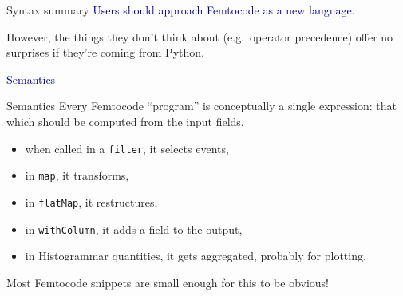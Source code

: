 \documentclass{beamer}
\begin{document}
\begin{frame}{Syntax summary}
\vspace{0.5 cm}
\textcolor{darkblue}{Users should approach Femtocode as a new language.}

\vspace{0.5 cm}
However, the things they don't think about (e.g.\ operator precedence) offer no surprises if they're coming from Python.

\vspace{0.5 cm}

\vspace{0.5 cm}

\vspace{0.5 cm}
\end{frame}

\begin{frame}{}
\begin{center}
\textcolor{darkblue}{\huge Semantics}
\end{center}
\end{frame}

\begin{frame}{Semantics}
Every Femtocode ``program'' is conceptually a single expression: that which should be computed from the input fields.
\begin{itemize}
\item when called in a {\tt filter}, it selects events,
\item in {\tt map}, it transforms,
\item in {\tt flatMap}, it restructures,
\item in {\tt withColumn}, it adds a field to the output,
\item in Histogrammar quantities, it gets aggregated, probably for plotting.
\end{itemize}

\vspace{0.5 cm}
Most Femtocode snippets are small enough for this to be obvious!
\end{frame}
\end{document}
